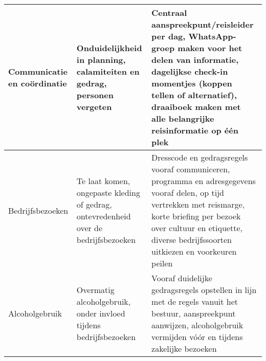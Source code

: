 \begin{table}[h!]
\begin{tabular}{|l|p{6cm}|p{5cm}|}
		\hline
		Communicatie en coördinatie & Onduidelijkheid in planning, calamiteiten en gedrag, personen vergeten & Centraal aanspreekpunt/reisleider per dag, WhatsApp-groep maken voor het delen van informatie, dagelijkse check-in momentjes (koppen tellen of alternatief), draaiboek maken met alle belangrijke reisinformatie op één plek \\
		\hline
		Bedrijfsbezoeken & Te laat komen, ongepaste kleding of gedrag, ontevredenheid over de bedrijfsbezoeken & Dresscode en gedragsregels vooraf communiceren, programma en adresgegevens vooraf delen, op tijd vertrekken met reismarge, korte briefing per bezoek over cultuur en etiquette, diverse bedrijfssoorten uitkiezen en voorkeuren peilen \\
		\hline
		Alcoholgebruik & Overmatig alcoholgebruik, onder invloed tijdens bedrijfsbezoeken & Vooraf duidelijke gedragsregels opstellen in lijn met de regels vanuit het bestuur, aanspreekpunt aanwijzen, alcoholgebruik vermijden vóór en tijdens zakelijke bezoeken \\
		\hline
	\end{tabular}
\end{table}
